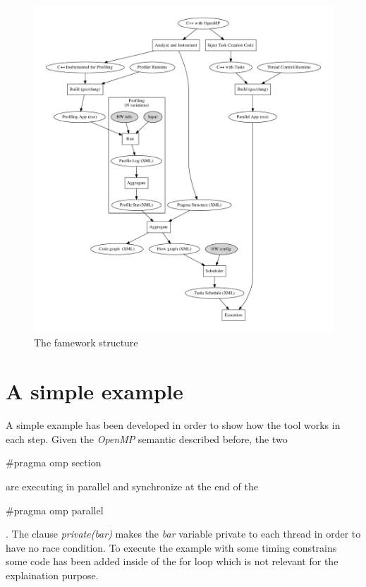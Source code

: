 \documentclass[a4paper,11pt,oneside]{book}
\begin{document}
\begin{figure}[H]
\centering
\includegraphics[scale=0.5]{tgraph.pdf}
\caption{The famework structure}
\label{framework}
\end{figure}


\section{A simple example}
\label{example}
A simple example has been developed in order to show how the tool works in each step. Given the \emph{OpenMP} semantic described before, the two \begin{bf}$\#$pragma omp section\end{bf} are executing in parallel and synchronize at the end of the \begin{bf}$\#$pragma omp parallel\end{bf}. The clause \emph{private(bar)} makes the \emph{bar} variable private to each thread in order to have no race condition. To execute the example with some timing constrains some code has been added inside of the for loop which is not relevant for the explaination purpose.
\end{document}
